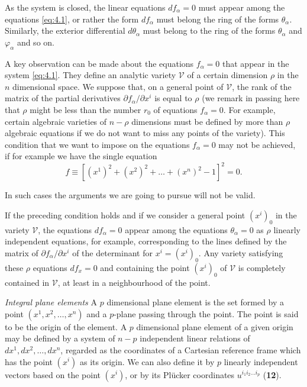 \documentclass[leqno,11pt]{book}
\numberwithin{equation}{chapter}
\newcommand{\pd}{\partial}
\theoremstyle{shape1}
\theoremstyle{shape0}
\theoremstyle{shape2}
\theoremstyle{definition}
\begin{document}
As the system is closed, the linear equations $df_{\alpha}=0$ must appear among the equations \eqref{eq:4.1}, or rather the form $df_{\alpha}$ must belong the ring of the forms $\theta_{\alpha}$. Similarly, the exterior differential $d\theta_{\alpha}$ must belong to the ring of the forms $\theta_{\alpha}$ and $\varphi_{\alpha}$ and so on.


\vspace{12pt}\fsec A key observation can be made about the equations $f_{\alpha}=0$ that appear in the system \eqref{eq:4.1}. They define an analytic variety $\mathcal{V}$ of a certain dimension $\rho$ in the $n$ dimensional space. We suppose that, on a general point of $\mathcal{V}$, the rank of the matrix of the partial derivatives $\pd f_{\alpha}/\pd x^{i}$ is equal to $\rho$ (we remark in passing here that $\rho$ might be less than the number $r_{0}$ of equations $f_{\alpha}=0$. For example, certain algebraic varieties of $n-\rho$ dimensions must be defined by more than $\rho$ algebraic equations if we do not want to miss any points of the variety). This condition that we want to impose on the equations $f_{\alpha}=0$ may not be achieved, if for example we have the single equation
\[
f\equiv[(x^{1})^{2}+(x^{2})^{2}+\dots+(x^{n})^{2}-1]^{2}=0.
\]

In such cases the arguments we are going to pursue will not be valid.

If the preceding condition holds and if we consider a general point $(x^{i})_{0}$ in the variety $\mathcal{V}$, the equations $df_{\alpha}=0$ appear among the equations $\theta_{\alpha}=0$ as $\rho$ linearly independent equations, for example, corresponding to the lines defined by the matrix of $\pd f_{\alpha}/\pd x^{i}$ of the determinant for $x^{i}=(x^{i})_{0}$. Any variety satisfying these $\rho$ equations $df_{x}=0$ and containing the point $(x^{i})_{0}$ of $\mathcal{V}$ is completely contained in $\mathcal{V}$, at least in a neighbourhood of the point.


\vspace{12pt}\fsec \emph{Integral plane elements} A $p$ dimensional plane element is the set formed by a point $(x^{1},x^{2},\dots,x^{n})$ and a $p$-plane passing through the point. The point is said to be the origin of the element. A $p$ dimensional plane element of a given origin may be defined by a system of $n-p$ independent linear relations of $dx^{1},dx^{2},\dots,dx^{n}$, regarded as the coordinates of a Cartesian reference frame which has the point $(x^{i})$ as its origin. We can also define it by $p$ linearly independent vectors based on the point $(x^{i})$, or by its Pl\"ucker coordinates $u^{i_{1}i_{2}\dots i_{p}}$ (\textsection\textbf{12}).
\end{document}
